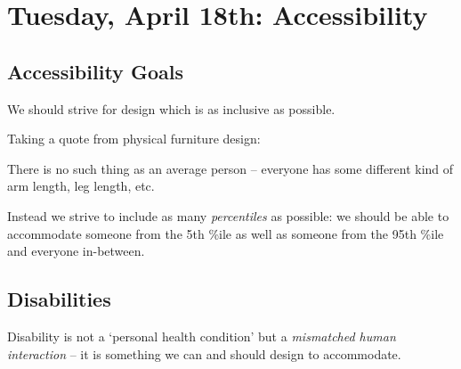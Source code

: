 \section{Tuesday, April 18th: Accessibility}
\subsection{Accessibility Goals}
We should strive for design which is as inclusive as possible.

Taking a quote from physical furniture design:
\begin{shaded}
There is no such thing as an average person -- everyone has some different kind of arm length, leg length, etc.
\end{shaded}

Instead we strive to include as many  \textit{percentiles} as possible: we should be able to accommodate someone from the 5th \%ile as well as someone from the 95th \%ile and everyone in-between.

\subsection{Disabilities}
Disability is not a `personal health condition' but a \textit{mismatched human interaction} -- it is something we can and should design to accommodate.

